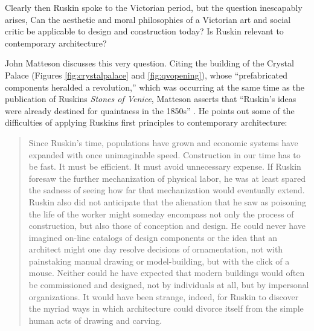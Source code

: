 
Clearly then Ruskin spoke to the Victorian period, but the question
inescapably arises, Can the aesthetic and moral philosophies of a
Victorian art and social critic be applicable to design and
construction today?  Is Ruskin relevant to contemporary architecture? 


John Matteson discusses this very question.  Citing the building of the
Crystal Palace (Figures \ref{fig:crystalpalace} and \ref{fig:qvopening}), 
whose ``prefabricated components heralded a
revolution,'' which was occurring at the same time as the publication of
Ruskin{\textquotesingle}s \textit{Stones of Venice}, Matteson asserts
that ``Ruskin’s ideas were already destined for quaintness in the
1850s'' \citep[][pg. 300]{matteson2002}.  He points out some of the difficulties of
applying Ruskin{\textquotesingle}s first principles to contemporary
architecture: 


\begin{quote}
Since Ruskin’s time, populations have grown and economic systems have
expanded with once unimaginable speed.  Construction in our time has to
be fast.  It must be efficient.  It must avoid unnecessary expense.  If
Ruskin foresaw the further mechanization of physical labor, he was at
least spared the sadness of seeing how far that mechanization would
eventually extend.  Ruskin also did not anticipate that the alienation
that he saw as poisoning the life of the worker might someday encompass
not only the process of construction, but also those of conception and
design.  He could never have imagined on-line catalogs of design
components or the idea that an architect might one day resolve
decisions of ornamentation, not with painstaking manual drawing or
model-building, but with the click of a mouse.  Neither could he have
expected that modern buildings would often be commissioned and
designed, not by individuals at all, but by impersonal organizations. 
It would have been strange, indeed, for Ruskin to discover the myriad
ways in which architecture could divorce itself from the simple human
acts of drawing and carving.\citep[][pg. 300]{matteson2002}
\end{quote}

